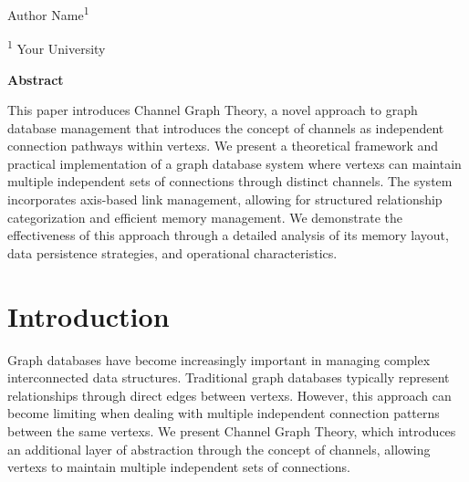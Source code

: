 \vspace{30pt}
\begin{center}
    \LARGE{}
\end{center}

\begin{center}
\vspace{4pt}
\large
    Author Name\textsuperscript{1}
    
\small
   \textsuperscript{1} Your University

\end{center}



\begin{small}
\begin{center}
\vspace{9pt}
\textbf{Abstract}    
\end{center}

\begin{adjustwidth}{20pt}{20pt}
\small \noindent 
This paper introduces Channel Graph Theory, a novel approach to graph database management that introduces the concept of channels as independent connection pathways within vertexs. We present a theoretical framework and practical implementation of a graph database system where vertexs can maintain multiple independent sets of connections through distinct channels. The system incorporates axis-based link management, allowing for structured relationship categorization and efficient memory management. We demonstrate the effectiveness of this approach through a detailed analysis of its memory layout, data persistence strategies, and operational characteristics.
\end{adjustwidth}


\end{small}




\vspace{10pt}
\section{Introduction}\label{Sec:Introduction}
Graph databases have become increasingly important in managing complex interconnected data structures. Traditional graph databases typically represent relationships through direct edges between vertexs. However, this approach can become limiting when dealing with multiple independent connection patterns between the same vertexs. We present Channel Graph Theory, which introduces an additional layer of abstraction through the concept of channels, allowing vertexs to maintain multiple independent sets of connections.

